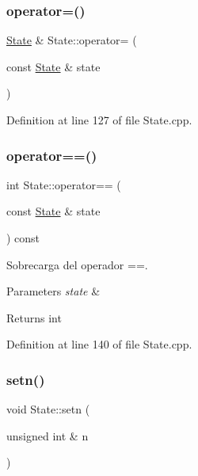 \subsubsection{\texorpdfstring{operator=()}{operator=()}}
{\footnotesize\ttfamily \hyperlink{class_state}{State} \& State\+::operator= (\begin{DoxyParamCaption}\item[{const \hyperlink{class_state}{State} \&}]{state }\end{DoxyParamCaption})}



Definition at line 127 of file State.\+cpp.

\mbox{\label{class_state_a6a848174b67647a6a7a3ce467260eb7f}} 
\subsubsection{\texorpdfstring{operator==()}{operator==()}}
{\footnotesize\ttfamily int State\+::operator== (\begin{DoxyParamCaption}\item[{const \hyperlink{class_state}{State} \&}]{state }\end{DoxyParamCaption}) const}



Sobrecarga del operador ==. 


\begin{DoxyParams}{Parameters}
{\em state} & \\
\hline
\end{DoxyParams}
\begin{DoxyReturn}{Returns}
int 
\end{DoxyReturn}


Definition at line 140 of file State.\+cpp.

\mbox{\label{class_state_af336de67e76fd18020cd363f82a2172e}} 
\subsubsection{\texorpdfstring{setn()}{setn()}}
{\footnotesize\ttfamily void State\+::setn (\begin{DoxyParamCaption}\item[{unsigned int \&}]{n }\end{DoxyParamCaption})}



